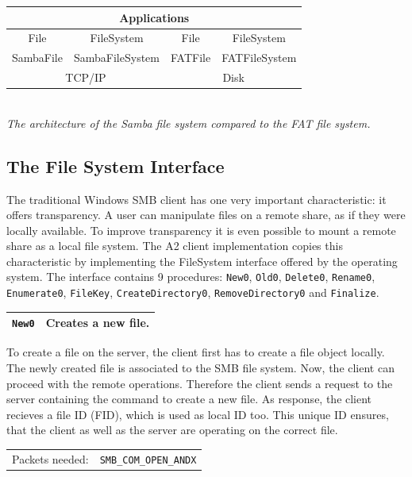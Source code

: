 \documentclass[11pt,a4paper]{book}
\begin{document}
\begin{center}
\begin{tabular}{|c||c||c||c|}
\hline
\multicolumn{4}{|c|}{Applications} \\
\hline
\hline
File & FileSystem & File & FileSystem \\
\hline 
\hline
SambaFile & SambaFileSystem & FATFile & FATFileSystem \\
\hline
\hline
\multicolumn{2}{|c||}{TCP/IP} & \multicolumn{2}{|c|}{Disk} \\
\hline
\end{tabular} \\
\vspace{6pt}
\textit{The architecture of the Samba file system compared to the FAT file system.}
\end{center}

\subsection{The File System Interface}
The traditional Windows SMB client has one very important characteristic: it offers transparency. A user can manipulate files on a remote share, as if they were locally available. To improve transparency it is even possible to mount a remote share as a local file system. The A2 client implementation copies this characteristic by implementing the FileSystem interface offered by the operating system. The interface contains 9 procedures: \texttt{New0}, \texttt{Old0}, \texttt{Delete0}, \texttt{Rename0}, \texttt{Enumerate0}, \texttt{FileKey}, \texttt{CreateDirectory0}, \texttt{RemoveDirectory0} and \texttt{Finalize}.

\begin{center}
\renewcommand{\tabcolsep}{5mm}
\begin{tabular}{p{3cm}p{8cm}}
\texttt{New0} & \textbf{Creates a new file.} \\ 
\hline
\end{tabular}
\end{center}
To create a file on the server, the client first has to create a file object locally. The newly created file is associated to the SMB file system. Now, the client can proceed with the remote operations. Therefore the client sends a request to the server containing the command to create a new file. As response, the client recieves a file ID (FID), which is used as local ID too. This unique ID ensures, that the client as well as the server are operating on the correct file. \\
\renewcommand{\tabcolsep}{5mm}
\begin{tabular}{p{3cm}p{8cm}}
Packets needed: & \texttt{SMB\_COM\_OPEN\_ANDX} \\
\end{tabular}
\end{document}
